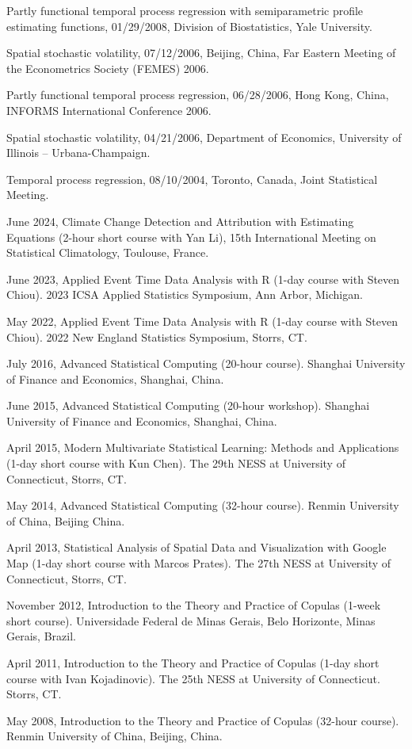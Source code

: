 \documentclass[Statistics]{vita}
\begin{document}
\begin{vita}
\begin{InvitedTalksLectures}
\begin{InvitedTalks}
  \item Partly functional temporal process regression with semiparametric profile estimating functions, 01/29/2008, Division of Biostatistics, Yale University.
  \item Spatial stochastic volatility, 07/12/2006, Beijing, China, Far Eastern Meeting of the Econometrics Society (FEMES) 2006.
  \item Partly functional temporal process regression, 06/28/2006, Hong Kong, China, INFORMS International Conference 2006.
  \item Spatial stochastic volatility, 04/21/2006, Department of Economics, University of Illinois -- Urbana-Champaign.
  \item Temporal process regression, 08/10/2004, Toronto, Canada, Joint Statistical Meeting.
  \end{InvitedTalks}
  \begin{InvitedWorkshops}
  \item June 2024, Climate Change Detection and Attribution with Estimating Equations (2-hour short course with Yan Li), 15th International Meeting on Statistical Climatology, Toulouse, France.
  \item June 2023, Applied Event Time Data Analysis with R (1-day course with Steven Chiou). 2023 ICSA Applied Statistics Symposium, Ann Arbor, Michigan.
  \item May 2022, Applied Event Time Data Analysis with R (1-day course with Steven Chiou). 2022 New England Statistics Symposium, Storrs, CT.
  \item July 2016, Advanced Statistical Computing (20-hour course). Shanghai University of Finance and Economics, Shanghai, China.
  \item June 2015, Advanced Statistical Computing (20-hour workshop). Shanghai University of Finance and Economics, Shanghai, China.
  \item April 2015, Modern Multivariate Statistical Learning: Methods and Applications (1-day short course with Kun Chen). The 29th NESS at University of Connecticut, Storrs, CT.
  \item May 2014, Advanced Statistical Computing (32-hour course). Renmin University of China, Beijing China.
  \item April 2013, Statistical Analysis of Spatial Data and Visualization with Google Map (1-day short course with Marcos Prates). The 27th NESS at University of Connecticut, Storrs, CT.
  \item November 2012, Introduction to the Theory and Practice of Copulas (1-week short course). Universidade Federal de Minas Gerais, Belo Horizonte, Minas Gerais, Brazil.
  \item April 2011, Introduction to the Theory and Practice of Copulas (1-day short course with Ivan Kojadinovic). The 25th NESS at University of Connecticut. Storrs, CT.
  \item May 2008, Introduction to the Theory and Practice of Copulas (32-hour course). Renmin University of China, Beijing, China.
  \end{InvitedWorkshops}
\end{InvitedTalksLectures}
\end{vita}
\end{document}
